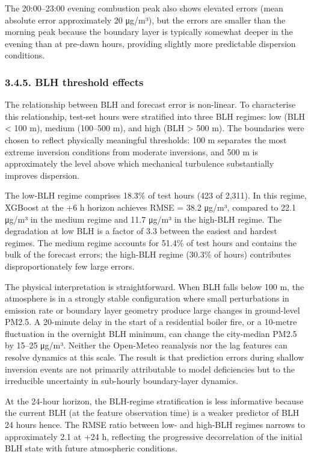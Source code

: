 The 20:00--23:00 evening combustion peak also shows elevated errors (mean absolute error approximately 20 μg/m³), but the errors are smaller than the morning peak because the boundary layer is typically somewhat deeper in the evening than at pre-dawn hours, providing slightly more predictable dispersion conditions.

\subsubsection{3.4.5. BLH threshold effects}\label{blh-threshold-effects}

The relationship between BLH and forecast error is non-linear. To characterise this relationship, test-set hours were stratified into three BLH regimes: low (BLH \textless{} 100 m), medium (100--500 m), and high (BLH \textgreater{} 500 m). The boundaries were chosen to reflect physically meaningful thresholds: 100 m separates the most extreme inversion conditions from moderate inversions, and 500 m is approximately the level above which mechanical turbulence substantially improves dispersion.

The low-BLH regime comprises 18.3\% of test hours (423 of 2,311). In this regime, XGBoost at the +6 h horizon achieves RMSE = 38.2 μg/m³, compared to 22.1 μg/m³ in the medium regime and 11.7 μg/m³ in the high-BLH regime. The degradation at low BLH is a factor of 3.3 between the easiest and hardest regimes. The medium regime accounts for 51.4\% of test hours and contains the bulk of the forecast errors; the high-BLH regime (30.3\% of hours) contributes disproportionately few large errors.

The physical interpretation is straightforward. When BLH falls below 100 m, the atmosphere is in a strongly stable configuration where small perturbations in emission rate or boundary layer geometry produce large changes in ground-level PM2.5. A 20-minute delay in the start of a residential boiler fire, or a 10-metre fluctuation in the overnight BLH minimum, can change the city-median PM2.5 by 15--25 μg/m³. Neither the Open-Meteo reanalysis nor the lag features can resolve dynamics at this scale. The result is that prediction errors during shallow inversion events are not primarily attributable to model deficiencies but to the irreducible uncertainty in sub-hourly boundary-layer dynamics.

At the 24-hour horizon, the BLH-regime stratification is less informative because the current BLH (at the feature observation time) is a weaker predictor of BLH 24 hours hence. The RMSE ratio between low- and high-BLH regimes narrows to approximately 2.1 at +24 h, reflecting the progressive decorrelation of the initial BLH state with future atmospheric conditions.

